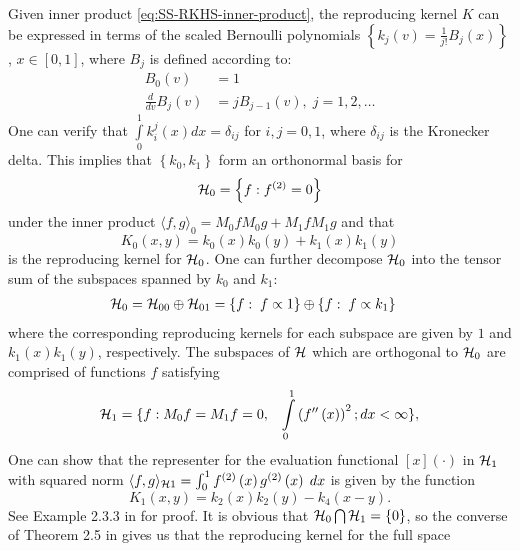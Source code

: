 Given inner product \eqref{eq:SS-RKHS-inner-product}, the reproducing kernel $K$ can be expressed in terms of the scaled Bernoulli polynomials $\left\{ k_j\left(v\right) = \frac{1}{j!}B_j\left(x\right) \right\}$, $x \in \left[0,1\right]$, where $B_j$ is defined according to:
\begin{align*}
B_0\left(v\right) &= 1\\
\frac{d}{dv} B_j\left(v\right) &= jB_{j-1}\left(v\right), \;j = 1, 2, \dots
\end{align*}
\noindent
One can verify that $\int \limits_0^1 k_i^j\left(x \right)dx = \delta_{ij}$ for $i,j= 0,1$, where $\delta_{ij}$ is the Kronecker delta. This implies that  $\left\{k_0, k_1\right\}$ form an orthonormal basis for 
\[
\mathcal{H}_{0} = \left\{ f: f^{\left( 2 \right)} = 0 \right\}
\] 
\noindent %
under the inner product $\langle f,g\rangle_0 =  M_0 f M_0 g + M_1 f M_1 g$ and that 
\[
K_{0}\left(x,y\right) =  k_0\left(x\right)  k_0\left(y\right) +  k_1\left(x\right)  k_1\left(y\right) 
\]
\noindent
is the reproducing kernel for $\mathcal{H}_{0}$. One can further decompose $\mathcal{H}_0$ into the tensor sum of the subspaces spanned by $k_0$ and $k_1$:
\begin{align}\label{eq:SS-RKHS-null-space-tensor-sum}
\mathcal{H}_0 &=  \mathcal{H}_{00} \oplus \mathcal{H}_{01}= \left\{f: \;f \propto 1 \right\} \oplus \left\{f: \;f \propto k_1\right\}
\end{align}
\noindent
where the corresponding reproducing kernels for each subspace are given by $1$ and $k_1\left(x\right)k_1\left(y\right)$, respectively. The subspaces of $\mathcal{H}$ which are orthogonal to $\mathcal{H}_0$ are comprised of functions $f$ satisfying 
\[
\hilbert_{1} = \lbrace f: M_0 f = M_1 f =  0,\;\;\;\int\limits_{0}^1 \left(f''\left(x\right)\right)^2;dx < \infty \rbrace, %
\]
One can show that the representer for the evaluation functional $\left[x\right] \left(\cdot\right)$ in $\mathcal{H}_{1}$ with squared norm $\langle f,g\rangle_{\mathcal{H}1}= \int_0^1 f^{\left(2\right)}\left(x\right)g^{\left(2\right)}\left(x\right)\;dx$ is given by the function
\begin{equation}
{{K }_{1}}\left(x,y\right) = k_{2}\left(x\right)k_{2}\left(y\right) - k_{4}\left(x-y \right).
\end{equation}
\noindent
See Example 2.3.3 in \cite{gu2002smoothing} for proof. It is obvious that $\mathcal{H}_0 \bigcap \mathcal{H}_1 = \left\{0\right\}$, so the converse of Theorem 2.5 in \cite{gu2013smoothing} gives us that the reproducing kernel for the full space
